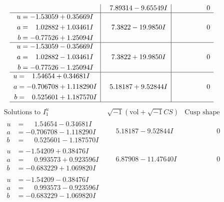 \documentclass[1p]{elsarticle_modified}
\theoremstyle{definition}
\newcommand{\I}{\sqrt{-1}}
\begin{document}
$$\begin{array}{c|c|c}
 & \phantom{-}7.89314 - 9.65549 I & \phantom{-0.000000 } 0 \\ \hline\begin{aligned}
u &= -1.53059 + 0.35669 I \\
a &= \phantom{-}1.02882 + 1.03461 I \\
b &= -0.77526 + 1.25094 I\end{aligned}
 & \phantom{-}7.3822 - 19.9850 I & \phantom{-0.000000 } 0 \\ \hline\begin{aligned}
u &= -1.53059 - 0.35669 I \\
a &= \phantom{-}1.02882 - 1.03461 I \\
b &= -0.77526 - 1.25094 I\end{aligned}
 & \phantom{-}7.3822 + 19.9850 I & \phantom{-0.000000 } 0 \\ \hline\begin{aligned}
u &= \phantom{-}1.54654 + 0.34681 I \\
a &= -0.706708 + 1.118290 I \\
b &= \phantom{-}0.525601 + 1.187570 I\end{aligned}
 & \phantom{-}5.18187 + 9.52844 I & \phantom{-0.000000 } 0\\
 \hline 
 \end{array}$$\newpage$$\begin{array}{c|c|c}  
\text{Solutions to }I^u_{1}& \I (\text{vol} + \sqrt{-1}CS) & \text{Cusp shape}\\
 \hline 
\begin{aligned}
u &= \phantom{-}1.54654 - 0.34681 I \\
a &= -0.706708 - 1.118290 I \\
b &= \phantom{-}0.525601 - 1.187570 I\end{aligned}
 & \phantom{-}5.18187 - 9.52844 I & \phantom{-0.000000 } 0 \\ \hline\begin{aligned}
u &= -1.54209 + 0.38476 I \\
a &= \phantom{-}0.993573 + 0.923596 I \\
b &= -0.683229 + 1.069820 I\end{aligned}
 & \phantom{-}6.87908 - 11.47640 I & \phantom{-0.000000 } 0 \\ \hline\begin{aligned}
u &= -1.54209 - 0.38476 I \\
a &= \phantom{-}0.993573 - 0.923596 I \\
b &= -0.683229 - 1.069820 I\end{aligned}

\end{array}$$
\end{document}
